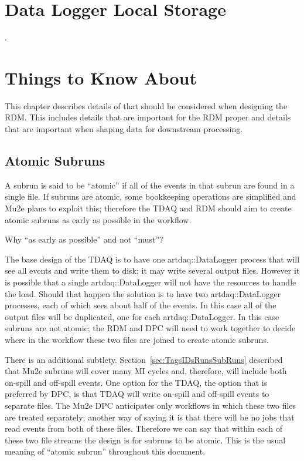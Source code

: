 \chapter{Data Logger Local Storage}
\label{app:DataLoggerLocalStorage}

.

\chapter{Things to Know About \art}

This chapter describes details of \art that should be considered when
designing the RDM.  This includes details that are important for the RDM
proper and details that are important when shaping data for downstream
processing.

\section{Atomic Subruns}
\label{sec:AtomicSubruns}

A subrun is said to be ``atomic'' if all of the events in that subrun are found in a single \art file.
If subruns are atomic, some bookkeeping operations are simplified and Mu2e plans to exploit this;
therefore the TDAQ and RDM should aim to create atomic subruns as early as possible in the workflow.

Why ``as early as possible'' and not ``must''?

The base design of the TDAQ is to have one {\code artdaq::DataLogger} process that will
see all events and write them to disk; it may write several output files.
However it is possible that a single {\code artdaq::DataLogger} will not have the
resources to handle the load.  Should that happen the solution is to have two
{\code artdaq::DataLogger} processes, each of which sees about half of the events.
In this case all of the output files will be duplicated,
one for each {\code artdaq::DataLogger}.
In this case subruns are not atomic;
the RDM and DPC will need to work together to decide where in the workflow these two files
are joined to create atomic subruns.

There is an additional subtlety.
Section~\ref{sec:TagsIDsRunsSubRuns} described that Mu2e subruns will cover many MI cycles
and, therefore, will include both on-spill and off-spill events.
One option for the TDAQ, the option that is preferred by DPC,
is that TDAQ will write on-spill and off-spill events to separate files.
The Mu2e DPC anticipates only workflows in which these two files are treated separately;
another way of saying it is that there will be no jobs that read events from both of these files.
Therefore we can say that within each of these two file streams the design is for subruns to be atomic.
This is the usual meaning of ``atomic subrun'' throughout this document.

